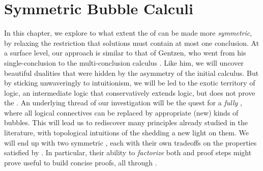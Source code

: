 \setchapterpreamble[u]{\margintoc}
\chapter{Symmetric Bubble Calculi}


\begin{scope}


In this chapter, we explore to what extent the  of
 can be made more \emph{symmetric}, by relaxing the restriction
that solutions must contain at most one conclusion. At a surface level, our
approach is similar to that of Gentzen, who went from his single-conclusion
  to the multi-conclusion calculus . Like
him, we will uncover beautiful dualities that were hidden by the asymmetry of
the initial calculus. But by sticking unwaveringly to intuitionism, we will be
led to the exotic territory of  logic, an intermediate
logic that conservatively extends  logic, but does not prove the
. An underlying thread of our investigation will be the
quest for a \emph{fully } , where all logical connectives
can be replaced by appropriate (new) kinds of bubbles. This will lead us to
rediscover many principles already studied in the 
literature, with topological intuitions of the   shedding a new
light on them. We will end up with two symmetric , each with their
own tradeoffs on the properties satisfied by . In particular,
their ability to \emph{factorize} both  and  proof steps might
prove useful to build concise proofs, all through .


\end{scope}
